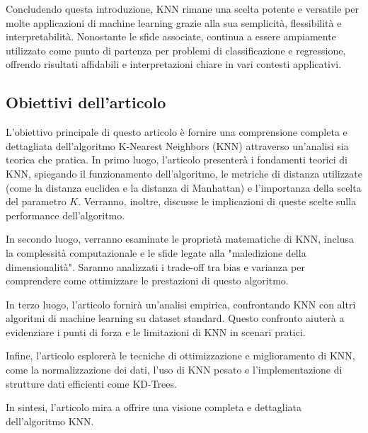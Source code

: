 Concludendo questa introduzione, KNN rimane una scelta potente e versatile per molte applicazioni di machine learning grazie alla sua semplicità, flessibilità e interpretabilità. Nonostante le sfide associate, continua a essere ampiamente utilizzato come punto di partenza per problemi di classificazione e regressione, offrendo risultati affidabili e interpretazioni chiare in vari contesti applicativi.

\subsection{Obiettivi dell'articolo}

L'obiettivo principale di questo articolo è fornire una comprensione completa e dettagliata 
dell'algoritmo K-Nearest Neighbors (KNN) attraverso un'analisi sia teorica che pratica. 
In primo luogo, l'articolo presenterà i fondamenti teorici di KNN, spiegando il funzionamento 
dell'algoritmo, le metriche di distanza utilizzate (come la distanza euclidea e la distanza di Manhattan) 
e l'importanza della scelta del parametro $K$. Verranno, inoltre, discusse le implicazioni di queste scelte 
sulla performance dell'algoritmo.

In secondo luogo, verranno esaminate le proprietà matematiche di KNN, inclusa la complessità 
computazionale e le sfide legate alla "maledizione della dimensionalità". Saranno analizzati i 
trade-off tra bias e varianza per comprendere come ottimizzare le prestazioni di questo algoritmo.

In terzo luogo, l'articolo fornirà un'analisi empirica, confrontando KNN con altri algoritmi 
di machine learning su dataset standard. Questo confronto aiuterà a evidenziare i punti di forza 
e le limitazioni di KNN in scenari pratici.

Infine, l'articolo esplorerà le tecniche di ottimizzazione e miglioramento di KNN, 
come la normalizzazione dei dati, l'uso di KNN pesato e l'implementazione di strutture 
dati efficienti come KD-Trees. 

In sintesi, l'articolo mira a offrire una visione completa e 
dettagliata dell'algoritmo KNN.